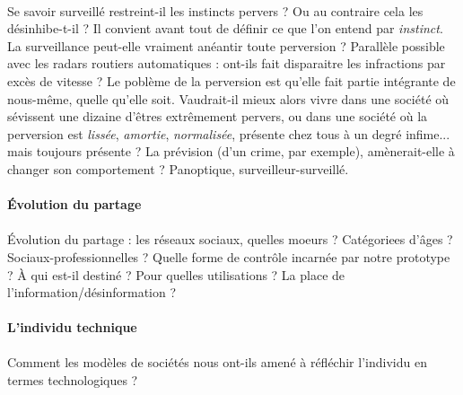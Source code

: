 \paragraph{} Se savoir surveillé restreint-il les instincts pervers ?
Ou au contraire cela les désinhibe-t-il ? Il convient avant tout de définir ce que l'on
entend par \emph{instinct}. La surveillance peut-elle vraiment anéantir toute perversion ?
Parallèle possible avec les radars routiers automatiques : ont-ils fait disparaitre les
infractions par excès de vitesse ? Le poblème de la perversion est qu'elle fait partie
intégrante de nous-même, quelle qu'elle soit. Vaudrait-il mieux alors vivre dans une société
où sévissent une dizaine d'êtres extrêmement pervers, ou dans une société où la perversion
est \emph{lissée}, \emph{amortie}, \emph{normalisée}, présente chez tous à un degré infime...
mais toujours présente ? La prévision (d'un crime, par exemple), amènerait-elle à changer
son comportement ? Panoptique, surveilleur-surveillé. 


\paragraph{Évolution du partage}

\paragraph{} Évolution du partage : les réseaux sociaux, quelles moeurs ? Catégoriees d'âges ? Sociaux-professionnelles ?
Quelle forme de contrôle incarnée par notre prototype ? À qui est-il destiné ? Pour quelles utilisations ?
La place de l'information/désinformation ?


\paragraph{L'individu technique}

\paragraph{} Comment les modèles de sociétés nous ont-ils amené à réfléchir l'individu en termes technologiques ?